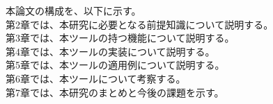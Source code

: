 本論文の構成を、以下に示す。\\
第2章では、本研究に必要となる前提知識について説明する。\\
第3章では、本ツールの持つ機能について説明する。\\
第4章では、本ツールの実装について説明する。\\
第5章では、本ツールの適用例について説明する。\\
第6章では、本ツールについて考察する。\\
第7章では、本研究のまとめと今後の課題を示す。